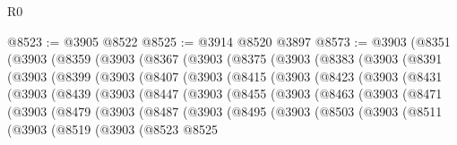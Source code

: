 \begin{lexlean}{R0}
\begin{coremodule}
@8523 := @3905 @8522
@8525 := @3914 @8520 @3897
@8573 := @3903
    (@8351
      (@3903
        (@8359
          (@3903
            (@8367
              (@3903
                (@8375
                  (@3903
                    (@8383
                      (@3903
                        (@8391
                          (@3903
                            (@8399
                              (@3903
                                (@8407
                                  (@3903
                                    (@8415
                                      (@3903
                                        (@8423
                                          (@3903
                                            (@8431
                                              (@3903
                                                (@8439
                                                  (@3903
                                                    (@8447
                                                      (@3903
                                                        (@8455
                                                          (@3903
                                                            (@8463
                                                              (@3903
                                                                (@8471
                                                                  (@3903
                                                                    (@8479
                                                                      (@3903
                                                                        (@8487
                                                                          (@3903
                                                                            (@8495
                                                                              (@3903
                                                                                (@8503
                                                                                  (@3903
                                                                                    (@8511
                                                                                      (@3903
                                                                                        (@8519
                                                                                          (@3903
                                                                                            (@8523
                                                                                              @8525

\end{coremodule}
\end{lexlean}
